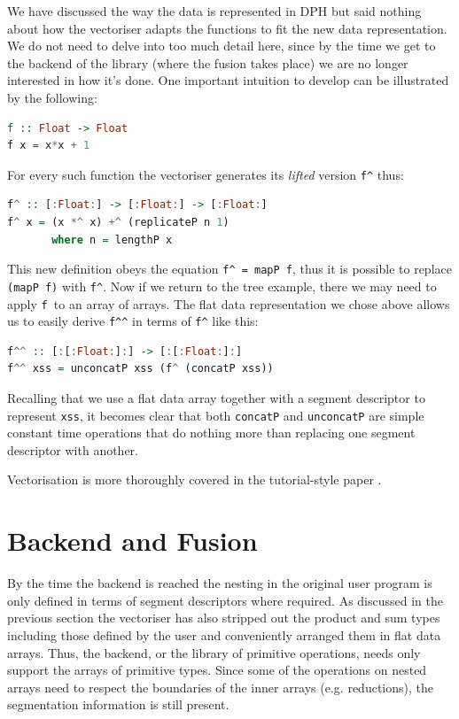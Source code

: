 \documentclass[preamble.tex]{subfiles}
\begin{document}
We have discussed the way the data is represented in DPH but said nothing about how the vectoriser adapts the functions to fit the new data representation. We do not need to delve into too much detail here, since by the time we get to the backend of the library (where the fusion takes place) we are no longer interested in how it's done. One important intuition to develop can be illustrated by the following:

\begin{lstlisting}[basicstyle={\ttfamily},language=Haskell]
f :: Float -> Float
f x = x*x + 1
\end{lstlisting}


For every such function the vectoriser generates its \emph{lifted }version \texttt{f\textasciicircum{}} thus:

\begin{lstlisting}[basicstyle={\ttfamily},language=Haskell]
f^ :: [:Float:] -> [:Float:] -> [:Float:]
f^ x = (x *^ x) +^ (replicateP n 1)
       where n = lengthP x
\end{lstlisting}


This new definition obeys the equation \texttt{f\textasciicircum{} = mapP f}, thus it is possible to replace \texttt{(mapP f)} with \texttt{f\textasciicircum{}}. Now if we return to the tree example, there we may need to apply \texttt{f }to an array of arrays. The flat data representation we chose above allows us to easily derive \texttt{f\textasciicircum{}\textasciicircum{}} in terms of \texttt{f\textasciicircum{}} like this:

\begin{lstlisting}[basicstyle={\ttfamily},language=Haskell]
f^^ :: [:[:Float:]:] -> [:[:Float:]:]
f^^ xss = unconcatP xss (f^ (concatP xss))
\end{lstlisting}


Recalling that we use a flat data array together with a segment descriptor to represent \texttt{xss}, it becomes clear that both \texttt{concatP} and \texttt{unconcatP} are simple constant time operations that do nothing more than replacing one segment descriptor with another.

Vectorisation is more thoroughly covered in the tutorial-style paper \cite{PLKC08}.


\section{Backend and Fusion}

By the time the backend is reached the nesting in the original user program is only defined in terms of segment descriptors where required. As discussed in the previous section the vectoriser has also stripped out the product and sum types including those defined by the user and conveniently arranged them in flat data arrays. Thus, the backend, or the library of primitive operations, needs only support the arrays of primitive types. Since some of the operations on nested arrays need to respect the boundaries of the inner arrays (e.g. reductions), the segmentation information is still present.
\end{document}
